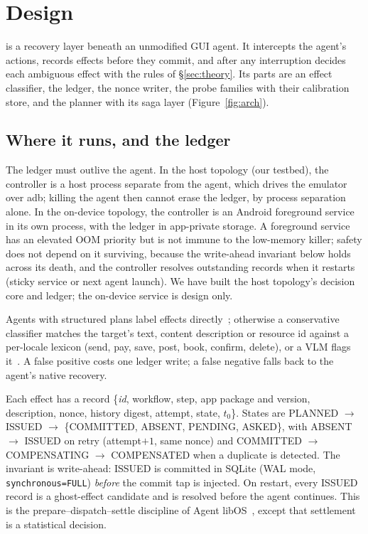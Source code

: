 \section{\sys Design}
\label{sec:design}

\sys is a recovery layer beneath an unmodified GUI agent. It intercepts the agent's actions, records effects before they commit, and after any interruption
decides each ambiguous effect with the rules of \S\ref{sec:theory}. Its parts are an effect classifier, the ledger, the nonce writer, the probe families with their
calibration store, and the \alg planner with its saga layer (Figure~\ref{fig:arch}).



\subsection{Where it runs, and the ledger}
\label{sec:design-ledger}
 The ledger must outlive the agent. In the host topology (our testbed), the controller is a host process separate from the agent, which drives the
emulator over adb; killing the agent then cannot erase the ledger, by process separation alone. In the on-device topology, the controller is an Android foreground service
in its own process, with the ledger in app-private storage. A foreground service has an elevated OOM priority but is not immune to the low-memory killer; safety does not depend on
it surviving, because the write-ahead invariant below holds across its death, and the controller resolves outstanding records when it restarts (sticky service or next agent launch).
We have built the host topology's decision core and ledger; the on-device service is design only.

 Agents with structured plans label effects directly~\cite{tian2025agentprog}; otherwise a conservative classifier matches the target's text, content
description or resource id against a per-locale lexicon (send, pay, save, post, book, confirm, delete), or a VLM flags it~\cite{lee2025verisafe,sun2025ossentinel}. A false
positive costs one ledger write; a false negative falls back to the agent's native recovery.

 Each effect has a record \{\textit{id}, workflow, step, app package and version, description, nonce, history digest, attempt, state, $t_0$\}. States are
\textsf{PLANNED} $\to$ \textsf{ISSUED} $\to$ \{\textsf{COMMITTED}, \textsf{ABSENT}, \textsf{PENDING}, \textsf{ASKED}\}, with \textsf{ABSENT} $\to$ \textsf{ISSUED} on retry
(attempt$+1$, same nonce) and \textsf{COMMITTED} $\to$ \textsf{COMPENSATING} $\to$ \textsf{COMPENSATED} when a duplicate is detected. The invariant is write-ahead:
\textsf{ISSUED} is committed in SQLite (WAL mode, \texttt{synchronous=FULL}) \emph{before} the commit tap is injected. On restart, every \textsf{ISSUED} record is a ghost-effect
candidate and is resolved before the agent continues. This is the prepare--dispatch--settle discipline of Agent libOS~\cite{zhang2026agentlibos}, except that settlement is a
statistical decision.

